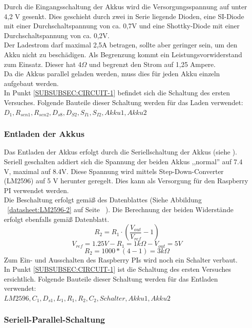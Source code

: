 \documentclass[12pt,a4paper]{article}
\begin{document}
Durch die Eingangsschaltung der Akkus wird die Versorgungsspannung auf unter 4,2 V gesenkt. Dies geschieht durch zwei in Serie liegende Dioden, eine SI-Diode mit einer Durchschaltspannung von ca. 0,7V und eine Shottky-Diode mit einer Durchschaltspannung von ca. 0,2V. \\
Der Ladestrom darf maximal 2,5A betragen, sollte aber geringer sein, um den Akku nicht zu beschädigen. Als Begrenzung kommt ein Leistungsvorwiderstand zum Einsatz. Dieser hat 4$\Omega$ und begrenzt den Strom auf 1,25 Ampere. \\
Da die Akkus parallel geladen werden, muss dies für jeden Akku einzeln aufgebaut werden. \\
In Punkt \ref{SUBSUBSEC:CIRCUIT-1} befindet sich die Schaltung des ersten Versuches. Folgende Bauteile dieser Schaltung werden für das Laden verwendet:\\
 $D_1,R_{sen1},R_{sen2},D_{s8},D_{S2},S_{I1},S_{I2}, Akku1, Akku2$ \\


\subsubsection{Entladen der Akkus}
\label{SUBSUBSEC:AKKUENTLOAD1}

Das Entladen der Akkus erfolgt durch die Seriellschaltung der Akkus (siehe ). Seriell geschalten addiert sich die Spannung der beiden Akkus ,,normal'' auf 7.4 V, maximal auf 8.4V. Diese Spannung wird mittels Step-Down-Converter (LM2596) auf 5 V herunter geregelt.  Dies kann als Versorgung für den Raspberry PI verwendet werden. \\
Die Beschaltung erfolgt gemäß des Datenblattes (Siehe Abbildung ~\ref{datasheet:LM2596-2} auf Seite ~\pageref{datasheet:LM2596-2}). Die Berechnung der beiden Widerstände erfolgt ebenfalls gemäß Datenblatt.
\[R_2 = R_1 \cdot \left(\frac{V_{out}}{V_{ref}} - 1 \right)\]
\[V_{ref} = 1.25 V - R_1 = 1 k\Omega - V_{out} = 5V\]
\[R_2 = 1000*(4-1) = 3 k\Omega\]
Zum Ein- und Ausschalten des Raspberry PIs wird noch ein Schalter verbaut. \\
In Punkt \ref{SUBSUBSEC:CIRCUIT-1} ist die Schaltung des ersten Versuches ersichtlich. Folgende Bauteile dieser Schaltung werden für das Entladen verwendet:\\ $LM2596,C_1,D_{s1},L_1,R_1,R_2,C_2,Schalter,Akku1, Akku2$ \\

\subsubsection{Seriell-Parallel-Schaltung}
\label{SUBSUBSEC:SERPAR}
\end{document}
